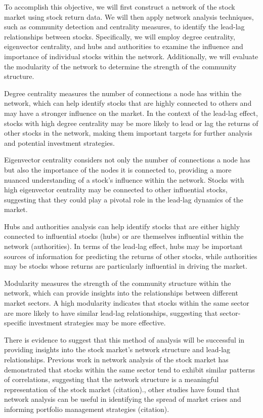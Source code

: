 \documentclass[onefignum,onetabnum]{siamart171218}
\begin{document}
To accomplish this objective, we will first construct a network of the stock market using stock return data.  We will then apply network analysis techniques, such as community detection and centrality measures, to identify the lead-lag relationships between stocks. Specifically, we will employ degree centrality, eigenvector centrality, and hubs and authorities to examine the influence and importance of individual stocks within the network. Additionally, we will evaluate the modularity of the network to determine the strength of the community structure.

Degree centrality measures the number of connections a node has within the network, which can help identify stocks that are highly connected to others and may have a stronger influence on the market. In the context of the lead-lag effect, stocks with high degree centrality may be more likely to lead or lag the returns of other stocks in the network, making them important targets for further analysis and potential investment strategies.

Eigenvector centrality considers not only the number of connections a node has but also the importance of the nodes it is connected to, providing a more nuanced understanding of a stock's influence within the network. Stocks with high eigenvector centrality may be connected to other influential stocks, suggesting that they could play a pivotal role in the lead-lag dynamics of the market.

Hubs and authorities analysis can help identify stocks that are either highly connected to influential stocks (hubs) or are themselves influential within the network (authorities). In terms of the lead-lag effect, hubs may be important sources of information for predicting the returns of other stocks, while authorities may be stocks whose returns are particularly influential in driving the market.

Modularity measures the strength of the community structure within the network, which can provide insights into the relationships between different market sectors. A high modularity indicates that stocks within the same sector are more likely to have similar lead-lag relationships, suggesting that sector-specific investment strategies may be more effective.

There is evidence to suggest that this method of analysis will be successful in providing insights into the stock market's network structure and lead-lag relationships. Previous work in network analysis of the stock market has demonstrated that stocks within the same sector tend to exhibit similar patterns of correlations, suggesting that the network structure is a meaningful representation of the stock market (citation)., other studies have found that network analysis can be useful in identifying the spread of market crises and informing portfolio management strategies (citation).
\end{document}
